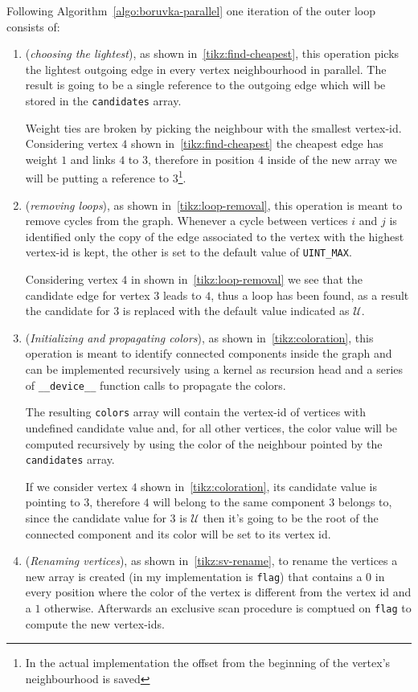 \documentclass[a4paper,10pt]{article}
\begin{document}
Following Algorithm~\ref{algo:boruvka-parallel} one iteration of the outer loop consists of:
\begin{enumerate}
	\item\label{item:choose-lightest} (\textit{choosing the lightest}), as shown in~\ref{tikz:find-cheapest}, this operation picks the lightest outgoing edge in every vertex neighbourhood in parallel. The result is going to be a single reference to the outgoing edge which will be stored in the \texttt{candidates} array.

	Weight ties are broken by picking the neighbour with the smallest vertex-id. Considering
	vertex $4$ shown in~\ref{tikz:find-cheapest} the cheapest edge has weight $1$ and
	links $4$ to $3$, therefore in position $4$ inside of the new array we will be
	putting a reference to $3$\footnote{In the actual implementation the offset from the
		beginning of the vertex's neighbourhood is saved}.
	\item\label{item:mirror-removal} (\textit{removing loops}), as shown in~\ref{tikz:loop-removal}, this operation is meant to remove cycles from the graph. Whenever a cycle between vertices $i$ and $j$ is identified only the copy of the edge associated to the vertex with the highest vertex-id is kept, the other is set to the default value of \texttt{UINT\_MAX}.

	Considering vertex $4$ in shown in~\ref{tikz:loop-removal} we see that the candidate
	edge for vertex $3$ leads to $4$, thus a loop has been found, as a result the
	candidate for $3$ is replaced with the default value indicated as $\mathcal{U}$.
	\item\label{item:coloration} (\textit{Initializing and propagating colors}), as shown in~\ref{tikz:coloration}, this operation is meant to identify connected components inside the graph and can be implemented recursively using a kernel as recursion head and a series of \texttt{\_\_device\_\_} function calls to propagate the colors.

	The resulting \texttt{colors} array will contain the vertex-id of vertices with undefined candidate value and, for all other vertices, the color value will be computed recursively by using the color of the neighbour pointed by the \texttt{candidates} array.

	If we consider vertex $4$ shown in~\ref{tikz:coloration}, its candidate value is
	pointing to $3$, therefore $4$ will belong to the same component $3$ belongs to,
	since the candidate value for $3$ is $\mathcal{U}$ then it's going to be the root of the
	connected component and its color will be set to its vertex id.
	\item\label{item:vertex-rename} (\textit{Renaming vertices}), as shown in~\ref{tikz:sv-rename}, to rename the vertices a new array is created (in my implementation is \texttt{flag}) that contains a $0$ in every position where the color of the vertex is different from the vertex id and a $1$ otherwise. Afterwards an exclusive scan procedure is comptued on \texttt{flag} to compute the new vertex-ids.


\end{enumerate}
\end{document}
